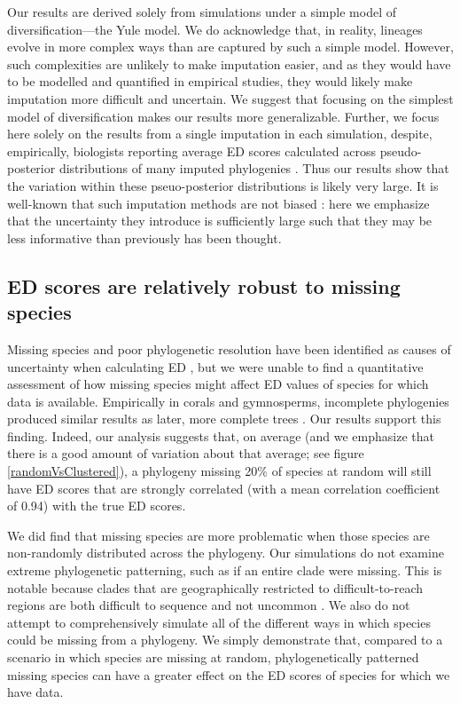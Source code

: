 \documentclass[10pt,english]{article}
\begin{document}
Our results are derived solely from simulations under a simple model of
diversification---the Yule model. We do acknowledge that, in reality, lineages
evolve in more complex ways than are captured by such a simple model. However,
such complexities are unlikely to make imputation easier, and as they would have
to be modelled and quantified in empirical studies, they would likely make
imputation more difficult and uncertain. We suggest that focusing on the
simplest model of diversification makes our results more generalizable. Further,
we focus here solely on the results from a single imputation in each simulation,
despite, empirically, biologists reporting average ED scores calculated across
pseudo-posterior distributions of many imputed phylogenies \autocite{Kuhn2011}.
Thus our results show that the variation within these pseuo-posterior
distributions is likely very large. It is well-known that such imputation
methods are not biased \autocite[indeed, this was originally shown
by][]{Kuhn2011}: here we emphasize that the uncertainty they introduce is
sufficiently large such that they may be less informative than previously has been
thought.

\subsection*{ED scores are relatively robust to missing species}
Missing species and poor phylogenetic resolution have been identified as causes
of uncertainty when calculating ED \autocite{Isaac2007}, but we were unable to
find a quantitative assessment of how missing species might affect ED values of
species for which data is available. Empirically in corals and gymnosperms,
incomplete phylogenies produced similar results as later, more complete trees
\autocite{Curnick2015, Forest2018}. Our results support this finding. Indeed,
our analysis suggests that, on average (and we emphasize that there is a good
amount of variation about that average; see figure \ref{randomVsClustered}), a
phylogeny missing 20\% of species at random will still have ED scores that are
strongly correlated (with a mean correlation coefficient of 0.94) with the true ED scores.

We did find that missing species are more problematic when those species are
non-randomly distributed across the phylogeny. Our simulations do not examine
extreme phylogenetic patterning, such as if an entire clade were missing. This
is notable because clades that are geographically restricted to
difficult-to-reach regions are both difficult to sequence and not uncommon
\autocite[as is seen with 27 coral species in the Indian
Ocean;][]{Arrigoni2012}. We also do not attempt to comprehensively simulate all
of the different ways in which species could be missing from a phylogeny. We
simply demonstrate that, compared to a scenario in which species are missing at
random, phylogenetically patterned missing species can have a greater effect on
the ED scores of species for which we have data.
\end{document}
